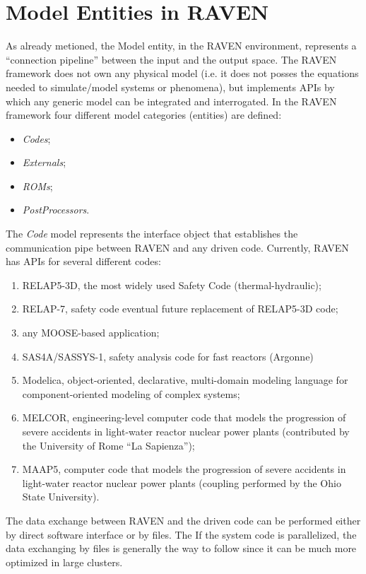\section{Model Entities in RAVEN}
\label{sec:models}
As already metioned, 
the Model entity, in the RAVEN environment, represents a ``connection pipeline'' 
between the input and the output space. The RAVEN framework does not own any 
physical model (i.e. it does not posses the equations needed to simulate/model 
systems or phenomena), but implements APIs by which any generic model can be 
integrated and 
interrogated. In the RAVEN framework four different model categories (entities) are 
defined:
\begin{itemize}
   \item \textit{Codes};
   \item \textit{Externals};
   \item \textit{ROMs};
   \item \textit{PostProcessors}.
\end{itemize}

The \textit{Code} model represents the interface object that establishes the communication pipe between RAVEN and any driven code. Currently, RAVEN has APIs for 
several different codes:
\begin{enumerate}
  \item RELAP5-3D, the most widely used Safety Code (thermal-hydraulic);
  \item RELAP-7, safety code eventual future replacement of RELAP5-3D code;
  \item any MOOSE-based application;
  \item SAS4A/SASSYS-1, safety analysis code for fast reactors (Argonne)
  \item Modelica, object-oriented, declarative, multi-domain modeling language for component-oriented modeling of complex systems;
  \item MELCOR, engineering-level computer code that models the progression of severe accidents in light-water reactor nuclear power plants (contributed by the 
           University of Rome “La Sapienza”);
  \item MAAP5, computer code that models the progression of severe accidents in light-water reactor nuclear power plants (coupling performed by the Ohio State 
          University).         
\end{enumerate}

The data exchange between RAVEN and the driven code can be performed either by direct software interface or by files.
The
If the system code is parallelized, the data exchanging by files is generally the way to 
follow since it can be much more optimized in large clusters.

